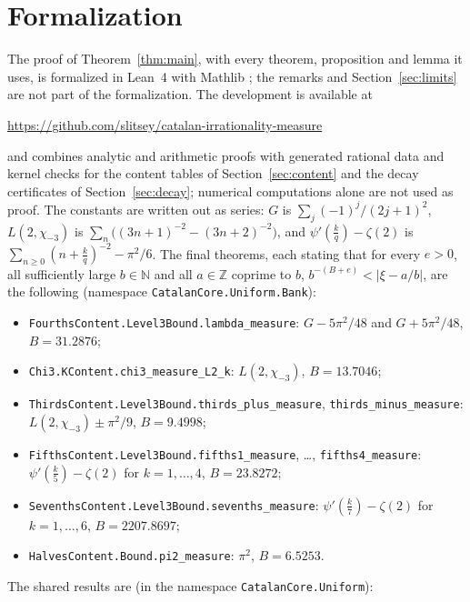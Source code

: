 \documentclass[11pt]{amsart}
\newcommand{\FormalizationURL}{https://github.com/slitsey/catalan-irrationality-measure}
\newcommand{\FormalizationLink}{\url{\FormalizationURL}}
\theoremstyle{definition}
\theoremstyle{remark}
\numberwithin{equation}{section}
\newcommand{\Z}{\mathbb Z}
\newcommand{\N}{\mathbb N}
\newcommand{\lean}[1]{\nolinkurl{#1}}
\newcommand{\MuLamU}{31.2876}
\newcommand{\MuThirdsU}{9.4998}
\newcommand{\MuFifthsU}{23.8272}
\newcommand{\MuSeventhsU}{2207.8697}
\newcommand{\MuChi}{13.7046}
\newcommand{\MuHalvesU}{6.5253}
\begin{document}
\section{Formalization}\label{sec:lean}
\raggedbottom

The proof of Theorem~\ref{thm:main}, with every theorem, proposition and lemma it uses, is formalized in Lean~4
\cite{Lean4} with Mathlib \cite{Mathlib}; the remarks and Section~\ref{sec:limits} are not part of the formalization. The
development is available at
\begin{center}
\FormalizationLink
\end{center}
and combines analytic and arithmetic proofs with generated rational data and kernel checks for the content tables of
Section~\ref{sec:content} and the decay certificates of Section~\ref{sec:decay}; numerical computations alone are not used as
proof. The constants are written out as series: $G$ is
$\sum_j(-1)^j/(2j+1)^2$, $L(2,\chi_{-3})$ is $\sum_n\bigl((3n+1)^{-2}-(3n+2)^{-2}\bigr)$, and $\psi'(\frac kq)-\zeta(2)$ is
$\sum_{n\ge0}(n+\frac kq)^{-2}-\pi^2/6$. The final theorems, each stating that for every $e>0$, all sufficiently large
$b\in\N$ and all $a\in\Z$ coprime to $b$, $b^{-(B+e)}<|\xi-a/b|$,
are the following (namespace \lean{CatalanCore.Uniform.Bank}):
\begin{itemize}
\item \lean{FourthsContent.Level3Bound.lambda_measure}: $G-5\pi^2/48$ and $G+5\pi^2/48$, $B=\MuLamU$;
\item \lean{Chi3.KContent.chi3_measure_L2_k}: $L(2,\chi_{-3})$, $B=\MuChi$;
\item \lean{ThirdsContent.Level3Bound.thirds_plus_measure}, \lean{thirds_minus_measure}:
 $L(2,\chi_{-3})\pm\pi^2/9$, $B=\MuThirdsU$;
\item \lean{FifthsContent.Level3Bound.fifths1_measure}, \dots, \lean{fifths4_measure}:
 $\psi'(\frac k5)-\zeta(2)$ for $k=1,\dots,4$, $B=\MuFifthsU$;
\item \lean{SeventhsContent.Level3Bound.sevenths_measure}:
 $\psi'(\frac k7)-\zeta(2)$ for $k=1,\dots,6$, $B=\MuSeventhsU$;
\item \lean{HalvesContent.Bound.pi2_measure}: $\pi^2$, $B=\MuHalvesU$.
\end{itemize}
The shared results are (in the namespace \lean{CatalanCore.Uniform}):
\end{document}
